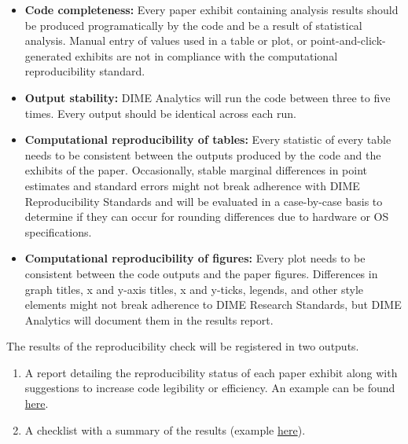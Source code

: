 \begin{fullwidth}
	\bigskip

	\begin{itemize}
		\setlength\itemsep{-0.1em}
		\item \textbf{Code completeness:} Every paper exhibit containing analysis results should be produced programatically by the code and be a result of statistical analysis. Manual entry of values used in a table or plot, or point-and-click-generated exhibits are not in compliance with the computational reproducibility standard.
		\item \textbf{Output stability:} DIME Analytics will run the code between three to five times. Every output should be  identical across each run.
		\item \textbf{Computational reproducibility of tables:} Every statistic of every table needs to be consistent between the outputs produced by the code and the exhibits of the paper. Occasionally, stable marginal differences in point estimates and standard errors might not break adherence with DIME Reproducibility Standards and will be evaluated in a case-by-case basis to determine if they can occur for rounding differences due to hardware or OS specifications.
		\item \textbf{Computational reproducibility of figures:} Every plot needs to be consistent between the code outputs and the paper figures. Differences in graph titles, x and y-axis titles, x and y-ticks, legends, and other style elements might not break adherence to DIME Research Standards, but DIME Analytics will document them in the results report.
	\end{itemize}

	\bigskip
	
	The results of the reproducibility check will be registered in two outputs.

	\bigskip

	\begin{enumerate}
		\setlength\itemsep{-0.1em}
		\item A report detailing the reproducibility status of each paper exhibit along with suggestions to increase code legibility or efficiency. An example can be found \href{https://github.com/worldbank/dime-standards/blob/master/dime-research-standards/pillar-3-research-reproducibility/DIME%20Analytics%20Reproducibility%20Check%20Comments%20example.pdf}{here}.
		\item A checklist with a summary of the results (example \href{https://raw.githubusercontent.com/worldbank/dime-standards/master/dime-research-standards/pillar-3-research-reproducibility/checklists/Reproducibility%20check%20result%20template.pdf}{here}).
	\end{enumerate}


\end{fullwidth}
